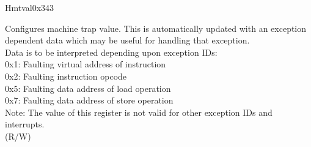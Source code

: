 \begin{register}{H}{mtval}{0x343}\label{regdesc:MTVAL}
%
\regnewline%
\begin{regdesc}\begin{reglist}
\label{fielddesc:MTVAL}\item [MTVAL] Configures machine trap value. This is automatically updated with an exception dependent data which may be useful for handling that exception.\\
Data is to be interpreted depending upon exception IDs:\\
0x1: Faulting virtual address of instruction\\
0x2: Faulting instruction opcode\\
0x5: Faulting data address of load operation\\
0x7: Faulting data address of store operation\\
Note: The value of this register is not valid for  other exception IDs and interrupts.\\
(R/W)
\end{reglist}\end{regdesc}
\end{register}

